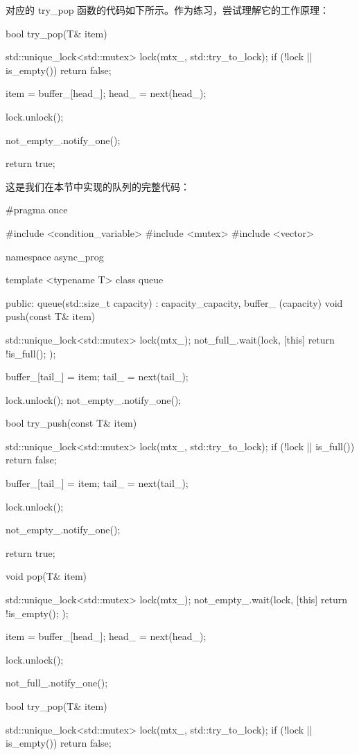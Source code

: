 对应的 try\_pop 函数的代码如下所示。作为练习，尝试理解它的工作原理：

\begin{cpp}
bool try_pop(T& item) {
    std::unique_lock<std::mutex> lock(mtx_, std::try_to_lock);
    if (!lock || is_empty()) {
        return false;
    }

    item = buffer_[head_];
    head_ = next(head_);

    lock.unlock();

    not_empty_.notify_one();

    return true;
}
\end{cpp}

这是我们在本节中实现的队列的完整代码：

\begin{cpp}
#pragma once

#include <condition_variable>
#include <mutex>
#include <vector>

namespace async_prog {
template <typename T>
class queue {
public:
    queue(std::size_t capacity) : capacity_{capacity}, buffer_
    (capacity) {}
    void push(const T& item) {
        std::unique_lock<std::mutex> lock(mtx_);
        not_full_.wait(lock, [this] { return !is_full(); });

        buffer_[tail_] = item;
        tail_ = next(tail_);

        lock.unlock();
        not_empty_.notify_one();
    }

    bool try_push(const T& item) {
        std::unique_lock<std::mutex> lock(mtx_, std::try_to_lock);
        if (!lock || is_full()) {
            return false;
        }

        buffer_[tail_] = item;
        tail_ = next(tail_);

        lock.unlock();

        not_empty_.notify_one();

        return true;
    }

    void pop(T& item) {
        std::unique_lock<std::mutex> lock(mtx_);
        not_empty_.wait(lock, [this] { return !is_empty(); });

        item = buffer_[head_];
        head_ = next(head_);

        lock.unlock();

        not_full_.notify_one();
    }

    bool try_pop(T& item) {
        std::unique_lock<std::mutex> lock(mtx_, std::try_to_lock);
        if (!lock || is_empty()) {
            return false;
        }

}}}
\end{cpp}
